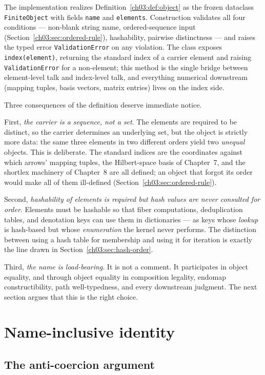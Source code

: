 The implementation realizes Definition~\ref{ch03:def:object} as the frozen
dataclass \texttt{FiniteObject} with fields \texttt{name} and
\texttt{elements}. Construction validates all four conditions --- non-blank
string name, ordered-sequence input (Section~\ref{ch03:sec:ordered-rule}),
hashability, pairwise distinctness --- and raises the typed error
\texttt{ValidationError} on any violation. The class exposes
\texttt{index(element)}, returning the standard index of a carrier element
and raising \texttt{ValidationError} for a non-element; this method is the
single bridge between element-level talk and index-level talk, and
everything numerical downstream (mapping tuples, basis vectors, matrix
entries) lives on the index side.

Three consequences of the definition deserve immediate notice.

First, \emph{the carrier is a sequence, not a set}. The elements are
required to be distinct, so the carrier determines an underlying set, but
the object is strictly more data: the same three elements in two different
orders yield two \emph{unequal} objects. This is deliberate. The standard
indices are the coordinates against which arrows' mapping tuples, the
Hilbert-space basis of Chapter~7, and the shortlex machinery of Chapter~8
are all defined; an object that forgot its order would make all of them
ill-defined (Section~\ref{ch03:sec:ordered-rule}).

Second, \emph{hashability of elements is required but hash values are never
consulted for order}. Elements must be hashable so that fiber computations,
deduplication tables, and denotation keys can use them in dictionaries ---
as keys whose \emph{lookup} is hash-based but whose \emph{enumeration} the
kernel never performs. The distinction between using a hash table for
membership and using it for iteration is exactly the line drawn in
Section~\ref{ch03:sec:hash-order}.

Third, \emph{the name is load-bearing}. It is not a comment. It
participates in object equality, and through object equality in composition
legality, endomap constructibility, path well-typedness, and every
downstream judgment. The next section argues that this is the right choice.

\section{Name-inclusive identity}\label{ch03:sec:name-identity}

\subsection{The anti-coercion argument}

